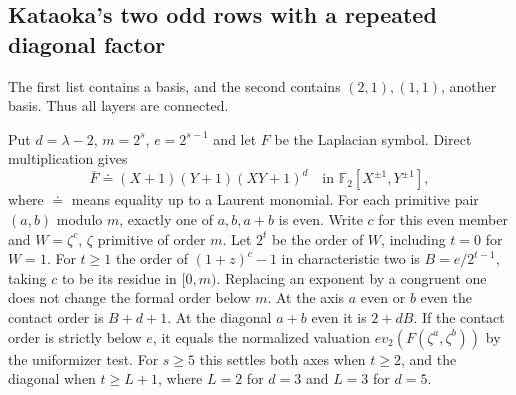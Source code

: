 \subsection{Kataoka's two odd rows with a repeated diagonal factor}

The first list contains a basis, and the second contains $(2,1),(1,1)$, another basis. Thus all layers are connected.

Put $d=\lambda-2$, $m=2^s$, $e=2^{s-1}$ and let $F$ be the Laplacian symbol. Direct multiplication gives
\[
 \overline F\doteq (X+1)(Y+1)(XY+1)^d
 \quad\text{in }\mathbb F_2[X^{\pm1},Y^{\pm1}],
\]
where $\doteq$ means equality up to a Laurent monomial. For each primitive pair $(a,b)$ modulo $m$, exactly one of $a,b,a+b$ is even. Write $c$ for this even member and $W=\zeta^c$, $\zeta$ primitive of order $m$. Let $2^t$ be the order of $W$, including $t=0$ for $W=1$. For $t\ge1$ the order of $(1+z)^c-1$ in characteristic two is $B=e/2^{t-1}$, taking $c$ to be its residue in $[0,m)$. Replacing an exponent by a congruent one does not change the formal order below $m$. At the axis $a$ even or $b$ even the contact order is $B+d+1$. At the diagonal $a+b$ even it is $2+dB$. If the contact order is strictly below $e$, it equals the normalized valuation $e v_2(F(\zeta^a,\zeta^b))$ by the uniformizer test. For $s\ge5$ this settles both axes when $t\ge2$, and the diagonal when $t\ge L+1$, where $L=2$ for $d=3$ and $L=3$ for $d=5$.

